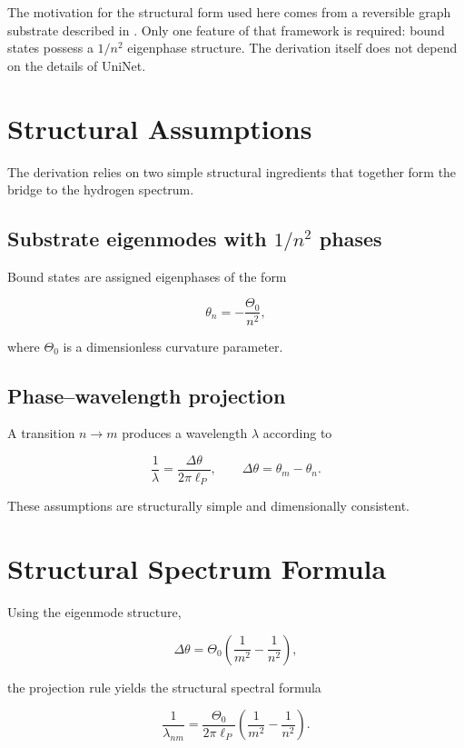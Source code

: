\documentclass[11pt,a4paper]{article}
\begin{document}
The motivation for the structural form used here comes from a reversible graph substrate described in \cite{uninet}. Only one feature of that framework is required: bound states possess a $1/n^2$ eigenphase structure. The derivation itself does not depend on the details of UniNet.

\section{Structural Assumptions}

The derivation relies on two simple structural ingredients that together form the bridge to the hydrogen spectrum.

\subsection{Substrate eigenmodes with $1/n^2$ phases}

Bound states are assigned eigenphases of the form


\[
\theta_n = -\frac{\Theta_0}{n^2},
\]


where $\Theta_0$ is a dimensionless curvature parameter.

\subsection{Phase--wavelength projection}

A transition $n \to m$ produces a wavelength $\lambda$ according to


\[
\frac{1}{\lambda} = \frac{\Delta\theta}{2\pi \ell_P},
\qquad
\Delta\theta = \theta_m - \theta_n.
\]



These assumptions are structurally simple and dimensionally consistent.

\section{Structural Spectrum Formula}

Using the eigenmode structure,


\[
\Delta\theta = \Theta_0\left(\frac{1}{m^2} - \frac{1}{n^2}\right),
\]


the projection rule yields the structural spectral formula


\[
\frac{1}{\lambda_{nm}}
=
\frac{\Theta_0}{2\pi \ell_P}
\left(\frac{1}{m^2} - \frac{1}{n^2}\right).
\]
\end{document}
